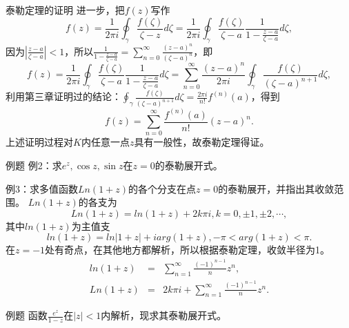 \documentclass[11pt]{beamer}
\newcommand{\kong}[1][0.5]{\vspace{#1cm}}
\begin{document}
\begin{frame}{泰勒定理的证明}
进一步，把$f(z)$写作
\begin{equation}
f(z) = \frac{1}{2\pi i} \oint_\gamma \frac{ f(\zeta)}{\zeta - z} d \zeta = \frac{1}{2\pi i} \oint_\gamma \frac{ f(\zeta)}{\zeta - a} \frac{1}{1 - \frac{z-a}{\zeta-a} } d \zeta,
\end{equation}
因为$|\frac{z-a}{\zeta-a}| < 1$，所以$\frac{1}{1 - \frac{z-a}{\zeta-a} } = \sum_{n=0}^{\infty} \frac{(z-a)^n}{(\zeta-a)^n}$，即
\begin{equation}
f(z)= \frac{1}{2\pi i} \oint_\gamma \frac{ f(\zeta)}{\zeta - a} \frac{1}{1 - \frac{z-a}{\zeta-a} } d \zeta
= \sum_{n=0}^{\infty} \frac{(z-a)^n}{2\pi i}  \oint_\gamma \frac{f(\zeta)}{(\zeta-a)^{n+1}} d \zeta,
\end{equation}
利用第三章证明过的结论：$\oint_\gamma \frac{f(\zeta)}{(\zeta-a)^{n+1}} d \zeta = \frac{2\pi i}{n!}f^{(n)}(a)$，得到
\begin{equation}
f(z) = \sum_{n=0}^{\infty} \frac{ f^{(n)}(a) }{ n!} (z-a)^n.
\end{equation}
上述证明过程对$K$内任意一点$z$具有一般性，故泰勒定理得证。
\end{frame}

\begin{frame}{例题}
例2：求$e^z, \cos z, \sin z$在$z=0$的泰勒展开式。

\kong[1]
例3：求多值函数$Ln(1+z)$的各个分支在点$z=0$的泰勒展开，并指出其收敛范围。
$Ln(1+z)$的各支为
\begin{equation}
Ln(1+z) = ln(1+z) + 2k\pi i, k=0, \pm 1, \pm 2, \cdots,
\end{equation}
其中$ln(1+z)$为主值支
\begin{equation}
ln(1+z) = ln|1+z| + i arg(1+z), -\pi < arg(1+z) < \pi.
\end{equation}
在$z=-1$处有奇点，在其他地方都解析，所以根据泰勒定理，收敛半径为1。
\begin{eqnarray}
ln(1+z) &=& \sum_{n=1}^{\infty} \frac{(-1)^{n-1}}{n}z^{n}, \nonumber\\
Ln(1+z) &=& 2k\pi i + \sum_{n=1}^{\infty} \frac{(-1)^{n-1}}{n}z^{n}.
\end{eqnarray}
\end{frame}

\begin{frame}{例题}
函数$\frac{e^z}{1-z}$在$|z|<1$内解析，现求其泰勒展开式。
\end{frame}
\end{document}
